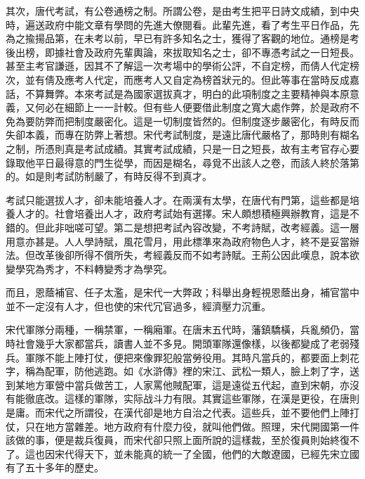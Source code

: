 其次，唐代考試，有公卷通榜之制。所謂公卷，是由考生把平日詩文成績，到中央時，遍送政府中能文章有學問的先進大僚閱看。此輩先進，看了考生平日作品，先為之揄揚品第，在未考以前，早已有許多知名之士，獲得了客觀的地位。通榜是考後出榜，即據社會及政府先輩輿論，來拔取知名之士，卻不專憑考試之一日短長。甚至主考官謙遜，因其不了解這一次考場中的學術公評，不自定榜，而倩人代定榜次，並有倩及應考人代定，而應考人又自定為榜首狀元的。但此等事在當時反成嘉話，不算舞弊。本來考試是為國家選拔真才，明白的此項制度之主要精神與本原意義，又何必在細節上一一計較。但有些人便要借此制度之寬大處作弊，於是政府不免為要防弊而把制度嚴密化。這是一切制度皆然的。但制度逐步嚴密化，有時反而失卻本義，而專在防弊上著想。宋代考試制度，是遠比唐代嚴格了，那時則有糊名之制，所憑則真是考試成績。其實考試成績，只是一日之短長，故有主考官存心要錄取他平日最得意的門生從學，而因是糊名，尋覓不出該人之卷，而該人終於落第的。如是則考試防制嚴了，有時反得不到真才。

考試只能選拔人才，卻未能培養人才。在兩漢有太學，在唐代有門第，這些都是培養人才的。社會培養出人才，政府考試始有選擇。宋人頗想積極興辦教育，這是不錯的。但此非咄嗟可望。第二是想把考試內容改變，不考詩賦，改考經義。這一層用意亦甚是。人人學詩賦，風花雪月，用此標準來為政府物色人才，終不是妥當辦法。但改革後卻所得不償所失，考經義反而不如考詩賦。王荊公因此嘆息，說本欲變學究為秀才，不料轉變秀才為學究。

而且，恩蔭補官、任子太濫，是宋代一大弊政；科舉出身輕視恩蔭出身，補官當中並不一定沒有人才，但也使的宋代冗官過多，經濟壓力沉重。

宋代軍隊分兩種，一稱禁軍，一稱廂軍。在唐末五代時，藩鎮驕橫，兵亂頻仍，當時社會幾乎大家都當兵，讀書人並不多見。開頭軍隊還像樣，以後都變成了老弱殘兵。軍隊不能上陣打仗，便把來像罪犯般當勞役用。其時凡當兵的，都要面上刺花字，稱為配軍，防他逃跑。如《水滸傳》裡的宋江、武松一類人，臉上刺了字，送到某地方軍營中當兵做苦工，人家罵他賊配軍，這是遠從五代起，直到宋朝，亦沒有能徹底改。這樣的軍隊，实际战斗力有限。其實這些軍隊，在漢是更役，在唐則是庸。而宋代之所謂役，在漢代卻是地方自治之代表。這些兵，並不要他們上陣打仗，只在地方當雜差。地方政府有什麼力役，就叫他們做。照理，宋代開國第一件該做的事，便是裁兵復員，而宋代卻只照上面所說的這樣裁，至於復員則始終復不了。這也因宋代得天下，並未能真的統一了全國，他們的大敵遼國，已經先宋立國有了五十多年的歷史。

